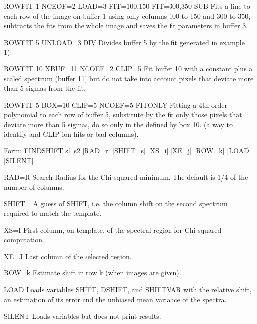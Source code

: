 {\newpage\clearpage
{}%
\begin{example}
  \item[ROWFIT 1 NCEOF=2 LOAD=3 FIT=100,150 FIT=300,350 SUB \hfill]{ Fits a
       line to each row of the image on buffer 1 using only columns 100 to
       150 and 300 to 350, subtracts the fits from the whole image and
       saves the fit parameters in buffer 3.}
\par
\item[ROWFIT 5 UNLOAD=3 DIV\hfill]{ Divides buffer 5 by the fit generated
       in example 1).}
\par
\item[ROWFIT 10 XBUF=11 NCOEF=2 CLIP=5\hfill]{ Fit buffer 10 with a
       constant plus a scaled spectrum (buffer 11) but do not take into
       account pixels that deviate more than 5 sigmas from the fit.}
\par
\item[ROWFIT 5 BOX=10 CLIP=5 NCOEF=5 FITONLY\hfill]{ Fitting a 4th-order
       polynomial to each row of buffer 5, substitute by the fit only those
       pixels that deviate more than 5 sigmas, do so only in the defined by
       box 10. (a way to identify and CLIP ion hits or bad columns).}
\end{example}%
\lthtmlfigureZ
\lthtmlcheckvsize\clearpage}

{\newpage\clearpage
{}%
\begin{command}
  \item[Form: FINDSHIFT s1 s2 {[RAD=r]} {[SHIFT=s]} {[XS=i]} {[XE=j]} 
       {[ROW=k]} {[LOAD]} {[SILENT]}\hfill]{}
  \item[RAD=R]{Search Radius for the Chi-squared minimum.
               The default is 1/4 of the number of columns.}
  \item[SHIFT=]{A guess of SHIFT, i.e. the column shift on the
                second spectrum required to match the template.}
  \item[XS=I]{First column, on template, of the spectral
              region for Chi-squared computation.}
  \item[XE=J]{Last column of the selected region.}
  \item[ROW=k]{Estimate shift in row k (when images are given).}
  \item[LOAD]{Loads variables SHIFT, DSHIFT, and SHIFTVAR with
              the relative shift, an estimation of its error
              and the unbiased mean variance of the spectra.}
  \item[SILENT]{Loads variables but does not print results.}
\end{command}%
\lthtmlfigureZ
\lthtmlcheckvsize\clearpage}

